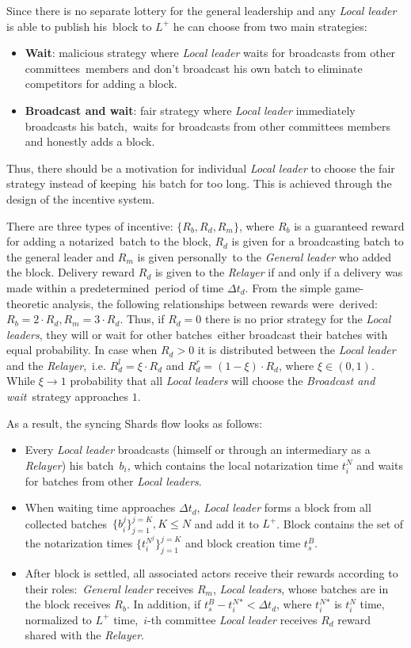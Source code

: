 Since there is no separate lottery for the general leadership and any \emph{Local leader} is able to publish his\
block to $L^+$ he can choose from two main strategies:
\begin{itemize}
    \item \textbf{Wait}: malicious strategy where \emph{Local leader} waits for broadcasts from other committees\
    members and don't broadcast his own batch to eliminate competitors for adding a block.
    \item \textbf{Broadcast and wait}: fair strategy where \emph{Local leader} immediately broadcasts his batch,\
    waits for broadcasts from other committees members and honestly adds a block.
\end{itemize}
Thus, there should be a motivation for individual \emph{Local leader} to choose the fair strategy instead of keeping\
his batch for too long.
This is achieved through the design of the incentive system.

There are three types of incentive: ${\{R_b, R_d, R_m\}}$, where $R_b$ is a guaranteed reward for adding a notarized\
batch to the block, $R_d$ is given for a broadcasting batch to the general leader and $R_m$ is given personally\
to the \emph{General leader} who added the block.
Delivery reward $R_d$ is given to the \emph{Relayer} if and only if a delivery was made within a predetermined\
period of time $\Delta t_d$.
From the simple game-theoretic analysis, the following relationships between rewards were\
derived: ${R_b = 2 \cdot R_d, R_m = 3 \cdot R_d}$.
Thus, if ${R_d=0}$ there is no prior strategy for the \emph{Local leaders}, they will or wait for other batches\
either broadcast their batches with equal probability.
In case when ${R_d>0}$ it is distributed between the \emph{Local leader} and the \emph{Relayer},\
i.e. ${R^l_d = \xi \cdot R_d}$ and  ${R^r_d = (1 - \xi) \cdot R_d}$, where ${\xi \in (0, 1)}$.
While ${\xi \rightarrow 1}$ probability that all \emph{Local leaders} will choose the \emph{Broadcast and wait}\
strategy approaches $1$.

As a result, the syncing Shards flow looks as follows:
\begin{itemize}
    \item Every \emph{Local leader} broadcasts (himself or through an intermediary as a \emph{Relayer}) his batch\
    $b_i$, which contains the local notarization time $t^N_i$ and waits for batches from other \emph{Local leaders}.
    \item When waiting time approaches $\Delta t_d$, \emph{Local leader} forms a block from all collected batches\
    ${\{b_i^j\}_{j=1}^{j=K}, K \le N}$ and add it to $L^+$.
    Block contains the set of the notarization times $\{t^{N^j}_i\}_{j=1}^{j=K}$ and block creation time $t^B_s$.
    \item After block is settled, all associated actors receive their rewards according to their roles:\
    \emph{General leader} receives $R_m$, \emph{Local leaders}, whose batches are in the block receives $R_b$.
    In addition, if ${t^B_s - t^N_i^* < \Delta t_d}$, where $t^N_i^*$ is $t^N_i$ time, normalized to $L^+$ time,\
    $i$-th committee \emph{Local leader} receives $R_d$ reward shared with the \emph{Relayer}.
\end{itemize}

